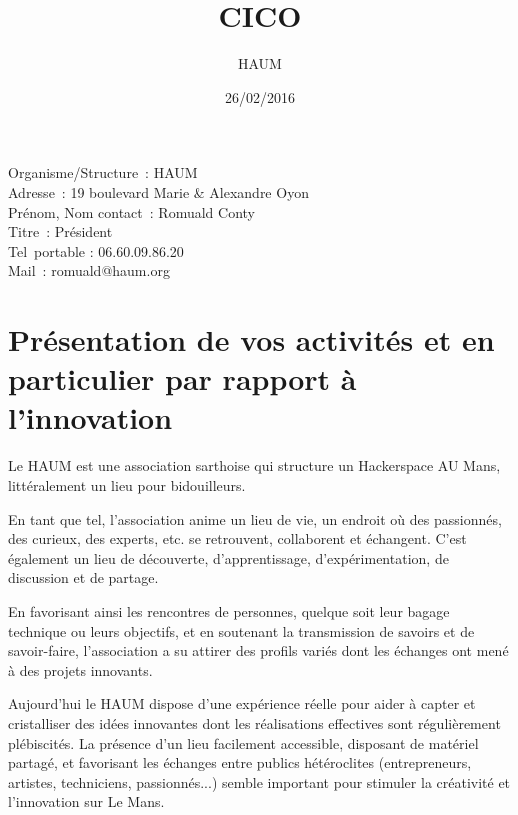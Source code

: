 \documentclass[a4paper,10pt]{scrartcl}
\title{CICO}
\author{HAUM}
\date{26/02/2016}
\begin{document}
\maketitle

\hfill
{}

\begin{minipage}{10cm}
Organisme/Structure : HAUM\\
Adresse : 19 boulevard Marie \& Alexandre Oyon\\
Prénom, Nom contact : Romuald Conty\\
Titre : Président\\
Tel portable : 06.60.09.86.20\\
Mail : romuald@haum.org\\
\end{minipage}


\section{Présentation de vos activités et en particulier par rapport à l’innovation}

Le HAUM est une association sarthoise qui structure un Hackerspace AU Mans, littéralement un lieu pour bidouilleurs.

En tant que tel, l'association anime un lieu de vie, un endroit où des passionnés, des curieux, des experts, etc. se retrouvent, collaborent et échangent. C'est également un lieu de découverte, d'apprentissage, d'expérimentation, de discussion et de partage.

En favorisant ainsi les rencontres de personnes, quelque soit leur bagage technique ou leurs objectifs, et en soutenant la transmission de savoirs et de savoir-faire, l'association a su attirer des profils variés dont les échanges ont mené à des projets innovants.

Aujourd'hui le HAUM dispose d'une expérience réelle pour aider à capter et cristalliser des idées innovantes dont les réalisations effectives sont régulièrement plébiscités. La présence d'un lieu facilement accessible, disposant de matériel partagé, et favorisant les échanges entre publics hétéroclites (entrepreneurs, artistes, techniciens, passionnés...) semble important pour stimuler la créativité et l'innovation sur Le Mans. 
\end{document}
